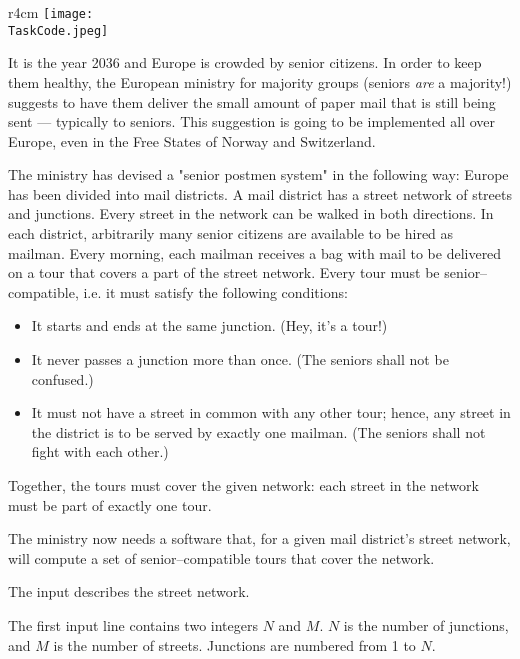 \documentclass{boi2014}
\renewcommand{\TaskCode}{postmen}
\begin{document}
    \begin{wrapfigure}[8]{r}{4cm}
        \vspace{-18pt}
		\texttt{[image: \\TaskCode.jpeg]}
	\end{wrapfigure}
    It is the year 2036 and Europe is crowded by senior citizens. In order to
    keep them healthy, the European ministry for majority groups (seniors
    \emph{are} a majority!) suggests to have them deliver the small amount of
    paper mail that is still being sent --- typically to seniors. This
    suggestion is going to be implemented all over Europe, even in the Free
    States of Norway and Switzerland.

    The ministry has devised a "senior postmen system" in the following way:
    Europe has been divided into mail districts. A mail district has a street
    network of streets and junctions. Every street in the network can be walked
    in both directions. In each district, arbitrarily many senior citizens are
    available to be hired as mailman. Every morning, each mailman receives a bag
    with mail to be delivered on a tour that covers a part of the street
    network. Every tour must be senior--compatible, i.e. it must satisfy the
    following conditions:

    \begin{itemize}
        \item It starts and ends at the same junction. (Hey, it’s a tour!)
        \item It never passes a junction more than once. (The seniors shall not
        be confused.)
        \item It must not have a street in common with any other tour; hence,
        any street in the district is to be served by exactly one mailman. (The
        seniors shall not fight with each other.)
    \end{itemize}

    Together, the tours must cover the given network: each street in the network
    must be part of exactly one tour.

    \Task
    The ministry now needs a software that, for a given mail district’s street
    network, will compute a set of senior--compatible tours that cover the
    network.

    \Input
    The input describes the street network.

    The first input line contains two integers $N$ and $M$. $N$ is the number of
    junctions, and $M$ is the number of streets. Junctions are numbered from 1
    to $N$.
\end{document}
